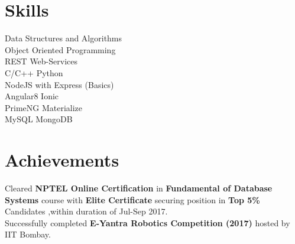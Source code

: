 \documentclass[]{jaydeep-resume-openfont}
\begin{document}
\begin{minipage}[t]{0.29\textwidth}




\section{Skills}

\textbullet{} Data Structures and Algorithms \\
\textbullet{} Object Oriented Programming \\
\textbullet{} REST Web-Services \\
\textbullet{} C/C++ \textbullet{} Python \\
\textbullet{}  NodeJS with Express (Basics)\\
\textbullet{} Angular8 \textbullet{} Ionic \\
\textbullet{} PrimeNG \textbullet{} Materialize \\
\textbullet{} MySQL \textbullet{} MongoDB \\
\sectionsep


\section{Achievements}

\textbullet{} Cleared \textbf{NPTEL Online Certification} in \textbf{Fundamental of Database Systems} course with \textbf{Elite Certificate} securing position in \textbf{Top 5\%} Candidates ,within duration of Jul-Sep 2017.\\
\textbullet{} Successfully completed \textbf{E-Yantra Robotics Competition (2017)} hosted by IIT Bombay.
\sectionsep


\end{minipage}
\end{document}
